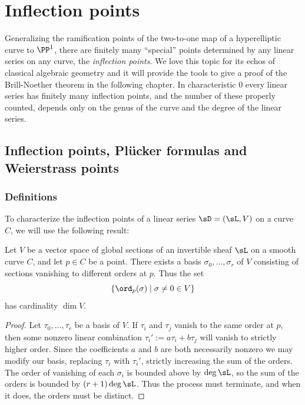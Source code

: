 

\chapter{Inflection points}\label{inflections chapter}
\label{InflectionsChapter}


Generalizing the ramification points of the two-to-one map of a hyperelliptic curve to $\PP^1$, there are finitely
many ``special'' points determined by any linear series on any curve, the \emph{inflection points}.
We love this topic for its echos of classical algebraic geometry and it will provide the tools to give a proof of the Brill-Noether theorem in the following chapter. In characteristic 0 every linear series has finitely many inflection points, and the number of these properly counted, depends only on the genus of the curve and the degree of the linear series.

\section{Inflection points,  Pl\"ucker formulas and Weierstrass points}

\subsection{Definitions}
To characterize the inflection points of a linear series $\sD = (\sL, V)$ on a curve $C$, we will use the following result:

\begin{proposition}\label{vanishing sequence} Let $V$ be a vector space of global sections of an invertible sheaf $\sL$ on a smooth curve $C$, and let $p \in C$ be a point. There exists a basis $\sigma_0, \dots, \sigma_r$ of $V$ consisting of sections vanishing to different orders at $p$. Thus the set
$$
\{ \ord_p(\sigma) \mid \sigma \neq 0 \in V \}
$$
 has cardinality $\dim V$.
\end{proposition}

\begin{proof} Let $\tau_0, \dots, \tau_r$ be a basis of $V$.  If  $\tau_i$ and $\tau_j$ vanish to the same order at $p$, then 
some nonzero linear combination $\tau_i' := a\tau_i+b\tau_j$  will vanish to strictly higher order. Since the coefficients $a$ and $b$ are both necessarily nonzero we may modify our basis, replacing $\tau_i$ with $\tau_i'$, strictly increasing the sum of the orders. 
The order of vanishing of each $\sigma_i$ is bounded above by $\deg \sL$, so the sum of the orders is bounded by $(r+1)\deg \sL$. Thus the process must terminate, and when it does,
 the orders must be distinct. \end{proof}


